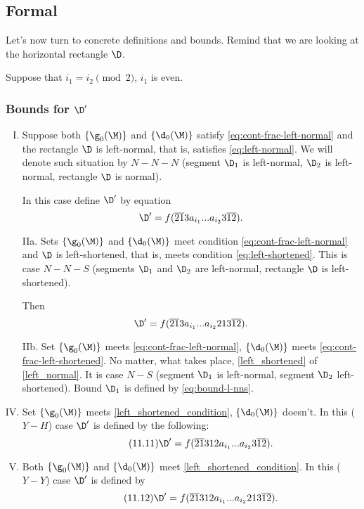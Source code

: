 \subsection{Formal}
\label{sbsc:boundaries_formal}

Let's now turn to concrete definitions and bounds.
Remind that we are looking at the horizontal rectangle $\D$.

Suppose that $i_1 = i_2 \pmod 2$, $i_1$ is even.

\subsubsection{Bounds for $\D'$}

\begin{enumerate}[I.]
	\item Suppose both $\{\g_0(\M)\}$ and $\{\d_0(\M)\}$
	satisfy \ref{eq:cont-frac-left-normal} and the rectangle $\D$ is left-normal,
	that is, satisfies \ref{eq:left-normal}.
	We will denote such situation by $N-N-N$
	(segment $\D_1$ is left-normal, $\D_2$ is left-normal, rectangle $\D$ is normal).
	
	In this case define $\D'$ by equation
	\begin{equation}%
		\D' = f(\overline{21}3a_{i_1}... a_{i_2}3\overline{12}).
	\end{equation}
	
	\item[IIa.] Sets $\{\g_0(\M)\}$ and $\{\d_0(\M)\}$
	meet condition \ref{eq:cont-frac-left-normal}
	and $\D$ is left-shortened, that is, meets condition \ref{eq:left-shortened}.
	This is case $N-N-S$
	(segments $\D_1$ and $\D_2$ are left-normal, rectangle $\D$ is left-shortened).
	
	Then
	\begin{equation}\label{eq:bound-l-nns} %
		\D' = f(\overline{21}3a_{i_1}... a_{i_2}213\overline{12}).
	\end{equation}
	
	\item[IIb.] Set $\{\g_0(\M)\}$ meets \ref{eq:cont-frac-left-normal},
	$\{\d_0(\M)\}$ meets \ref{eq:cont-frac-left-shortened}.
	No matter, what takes place, \ref{left_shortened} of \ref{left_normal}.
	It is case $N-S$
	(segment $\D_1$ is left-normal, segment $\D_2$ left-shortened).
	Bound $\D_1$ is defined by \ref{eq:bound-l-nns}.
	
	\addtocounter{enumi}{1}
	\item Set $\{\g_0(\M)\}$ meets \ref{left_shortened_condition},
	$\{\d_0(\M)\}$ doesn't.
	In this ($Y-H$) case $\D'$ is defined by the following:
	\begin{equation}\tag{11.11}\label{bound_l_yh}
		\D' = f(\overline{21}312a_{i_1}... a_{i_2}3\overline{12}).
	\end{equation}
	
	\item Both $\{\g_0(\M)\}$ and $\{\d_0(\M)\}$
	meet \ref{left_shortened_condition}.
	In this ($Y-Y$) case $\D'$ is defined by
	\begin{equation}\tag{11.12}
		\D' = f(\overline{21}312a_{i_1}... a_{i_2}213\overline{12}).
	\end{equation}
\end{enumerate}

